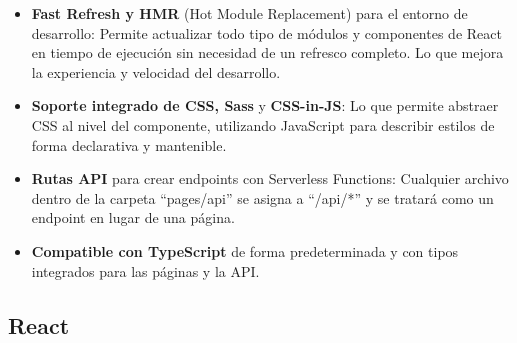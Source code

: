 \documentclass[12pt,twoside,titlepage]{report}
\begin{document}
\begin{itemize}
    \item \textbf{Fast Refresh y HMR} (Hot Module Replacement) para el entorno de desarrollo: Permite actualizar todo tipo de módulos y componentes de React en tiempo de ejecución sin necesidad de un refresco completo. Lo que mejora la experiencia y velocidad del desarrollo.

    \item \textbf{Soporte integrado de CSS, Sass} y \textbf{CSS-in-JS}: Lo que permite abstraer CSS al nivel del componente, utilizando JavaScript para describir estilos de forma declarativa y mantenible.
    \item \textbf{Rutas API} para crear endpoints con Serverless Functions: Cualquier archivo dentro de la carpeta ``pages/api'' se asigna a ``/api/*'' y se tratará como un endpoint en lugar de una página.
    \item \textbf{Compatible con TypeScript} de forma predeterminada y con tipos integrados para las páginas y la API.
\end{itemize}


\subsection{React}
\label{sec:React}
\end{document}
